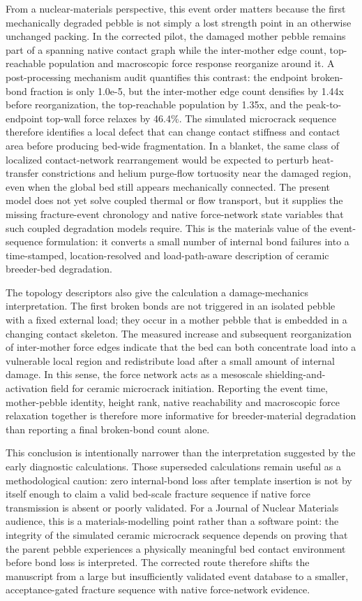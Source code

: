 \documentclass[5p,twocolumn]{elsarticle}
\begin{document}
From a nuclear-materials perspective, this event order matters because the first mechanically degraded pebble is not simply a lost strength point in an otherwise unchanged packing. In the corrected pilot, the damaged mother pebble remains part of a spanning native contact graph while the inter-mother edge count, top-reachable population and macroscopic force response reorganize around it. A post-processing mechanism audit quantifies this contrast: the endpoint broken-bond fraction is only 1.0e-5, but the inter-mother edge count densifies by 1.44x before reorganization, the top-reachable population by 1.35x, and the peak-to-endpoint top-wall force relaxes by 46.4\%. The simulated microcrack sequence therefore identifies a local defect that can change contact stiffness and contact area before producing bed-wide fragmentation. In a blanket, the same class of localized contact-network rearrangement would be expected to perturb heat-transfer constrictions and helium purge-flow tortuosity near the damaged region, even when the global bed still appears mechanically connected. The present model does not yet solve coupled thermal or flow transport, but it supplies the missing fracture-event chronology and native force-network state variables that such coupled degradation models require. This is the materials value of the event-sequence formulation: it converts a small number of internal bond failures into a time-stamped, location-resolved and load-path-aware description of ceramic breeder-bed degradation.


The topology descriptors also give the calculation a damage-mechanics interpretation. The first broken bonds are not triggered in an isolated pebble with a fixed external load; they occur in a mother pebble that is embedded in a changing contact skeleton. The measured increase and subsequent reorganization of inter-mother force edges indicate that the bed can both concentrate load into a vulnerable local region and redistribute load after a small amount of internal damage. In this sense, the force network acts as a mesoscale shielding-and-activation field for ceramic microcrack initiation. Reporting the event time, mother-pebble identity, height rank, native reachability and macroscopic force relaxation together is therefore more informative for breeder-material degradation than reporting a final broken-bond count alone.


This conclusion is intentionally narrower than the interpretation suggested by the early diagnostic calculations. Those superseded calculations remain useful as a methodological caution: zero internal-bond loss after template insertion is not by itself enough to claim a valid bed-scale fracture sequence if native force transmission is absent or poorly validated. For a Journal of Nuclear Materials audience, this is a materials-modelling point rather than a software point: the integrity of the simulated ceramic microcrack sequence depends on proving that the parent pebble experiences a physically meaningful bed contact environment before bond loss is interpreted. The corrected route therefore shifts the manuscript from a large but insufficiently validated event database to a smaller, acceptance-gated fracture sequence with native force-network evidence.
\end{document}
